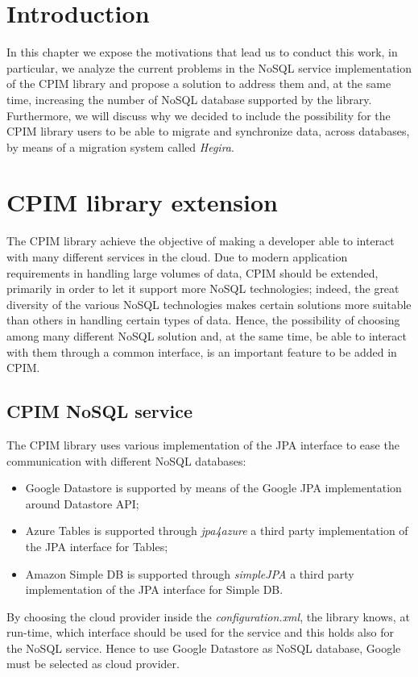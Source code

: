 \section{Introduction}
In this chapter we expose the motivations that lead us to conduct this work, in particular, we analyze the current problems in the NoSQL service implementation of the CPIM library and propose a solution to address them and, at the same time, increasing the number of NoSQL database supported by the library.
\noindent Furthermore, we will discuss why we decided to include the possibility for the CPIM library users to be able to migrate and synchronize data, across databases, by means of a migration system called \textit{Hegira}.

\section{CPIM library extension}
The CPIM library achieve the objective of making a developer able to interact with many different services in the cloud. Due to modern application requirements in handling large volumes of data, CPIM should be extended, primarily in order to let it support more NoSQL technologies; indeed, the great diversity of the various NoSQL technologies makes certain solutions more suitable than others in handling certain types of data. Hence, the possibility of choosing among many different NoSQL solution and, at the same time, be able to interact with them through a common interface, is an important feature to be added in CPIM. 

\subsection{CPIM NoSQL service}
The CPIM library uses various implementation of the JPA interface to ease the communication with different NoSQL databases:
\begin{itemize}
\item Google Datastore is supported by means of the Google JPA implementation around Datastore API;
\item Azure Tables is supported through \textit{jpa4azure} a third party implementation of the JPA interface for Tables;
\item Amazon Simple DB is supported through \textit{simpleJPA} a third party implementation of the JPA interface for Simple DB.
\end{itemize}
\noindent By choosing the cloud provider inside the \textit{configuration.xml}, the library knows, at run-time, which interface should be used for the service and this holds also for the NoSQL service. Hence to use Google Datastore as NoSQL database, Google must be selected as cloud provider.

